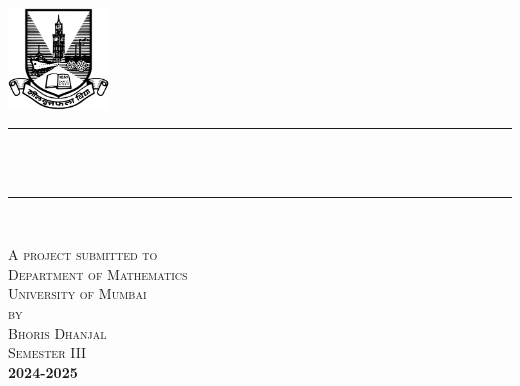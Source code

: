\begin{titlepage}
	\newcommand{\HRule}{\rule{\linewidth}{0.5mm}} %
	
	
	
	
	\center %
	
	\begin{center}
		
		
		
		
		\includegraphics[width=0.2\textwidth]{Images/uom.png}\\[1.5cm]
		\HRule \\[0.4cm]
		{ \huge \textsc \reporttitle}\\[0.4cm] %
		\HRule \\[2.5cm]
	\end{center}
	\textsc{
		\large A project submitted to\\
		\large Department of Mathematics\\
		\large University of Mumbai\\
		\large by\\[1cm]
		\large Bhoris Dhanjal\\[1em]
		\small Semester III}\\
	
	\vfill %
	\textbf{
		2024-2025}
			\newpage
		\ 
		\newpage
\end{titlepage}
